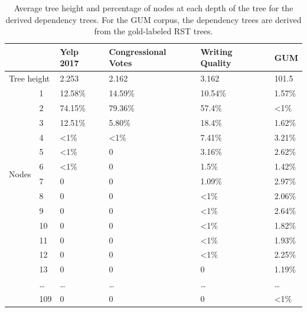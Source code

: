 \begin{table}[h!]
     \begin{center}
     \begin{tabular}{cllll|l}
     \toprule
                          &     & Yelp 2017      & Congressional Votes & Writing Quality & GUM\\ \hline\hline
\multicolumn{2}{l}{Tree height} & 2.253          & 2.162               & 3.162 &101.5          \\ \hline
\multirow{12}{*}{Nodes}   & 1   & 12.58\%        & 14.59\%             & 10.54\%    &1.57\%     \\
                          & 2   & 74.15\%        & 79.36\%             & 57.4\%    & \textless{}1\%     \\
                          & 3   & 12.51\%        & 5.80\%              & 18.4\%   &1.62\%       \\
                          & 4   & \textless{}1\% & \textless{}1\%      & 7.41\%    &3.21\%      \\
                          & 5   & \textless{}1\% & 0                   & 3.16\%   &2.62\%       \\
                          & 6   & \textless{}1\% & 0                   & 1.5\%   &1.42\%        \\
                          & 7   & 0              & 0                   & 1.09\%  &2.97\%        \\
                          & 8   & 0              & 0                   & \textless{}1\% &2.06\% \\
                          & 9   & 0              & 0                   & \textless{}1\% &2.64\% \\
                          & 10  & 0              & 0                   & \textless{}1\% &1.82\% \\
                          & 11  & 0              & 0                   & \textless{}1\% &1.93\% \\
                          & 12  & 0              & 0                   & \textless{}1\% &2.25\%\\
                & 13 & 0 &0 &0 &1.19\%\\
                &\ldots & \ldots & \ldots & \ldots &\ldots \\
                & 109 & 0 &0 &0 &\textless{}1\%\\
                \bottomrule
                          
\end{tabular}
      \caption{Average tree height and percentage of nodes at each depth of the tree for the derived dependency trees. For the GUM corpus, the dependency trees are derived from the gold-labeled RST trees.}
      \label{tab:latent_trees}
      \end{center}
      \end{table}
      
